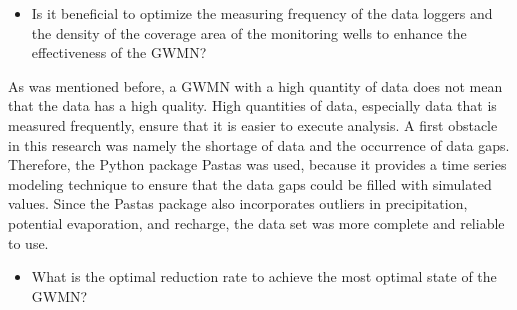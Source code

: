 \begin{itemize}
    \item Is it beneficial to optimize the measuring frequency of the data loggers and the density of the coverage area of the monitoring wells to enhance the effectiveness of the GWMN?

\end{itemize}

As was mentioned before, a GWMN with a high quantity of data does not mean that the data has a high quality. High quantities of data, especially data that is measured frequently, ensure that it is easier to execute analysis. A first obstacle in this research was namely the shortage of data and the occurrence of data gaps. Therefore, the Python package Pastas was used, because it provides a time series modeling technique to ensure that the data gaps could be filled with simulated values. Since the Pastas package also incorporates outliers in precipitation, potential evaporation, and recharge, the data set was more complete and reliable to use. 

\begin{itemize}
    \item What is the optimal reduction rate to achieve the most optimal state of the GWMN?
\end{itemize}

